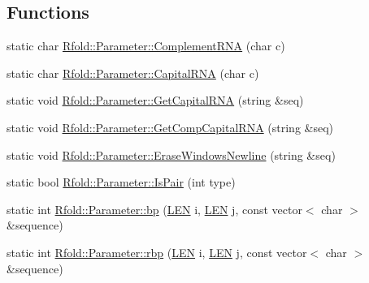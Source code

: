 \subsection*{Functions}
\begin{DoxyCompactItemize}
\item 
static char \hyperlink{namespace_rfold_1_1_parameter_a8042581cc300f83be2272d1ad1edd8d0}{Rfold\+::\+Parameter\+::\+Complement\+R\+N\+A} (char c)
\item 
static char \hyperlink{namespace_rfold_1_1_parameter_a9ecf67fadc41759309b73ccc9c3d7009}{Rfold\+::\+Parameter\+::\+Capital\+R\+N\+A} (char c)
\item 
static void \hyperlink{namespace_rfold_1_1_parameter_adc3e395c2db7c0097c3790922e221f18}{Rfold\+::\+Parameter\+::\+Get\+Capital\+R\+N\+A} (string \&seq)
\item 
static void \hyperlink{namespace_rfold_1_1_parameter_a064f7e3feb0336cd945b2679563f27a9}{Rfold\+::\+Parameter\+::\+Get\+Comp\+Capital\+R\+N\+A} (string \&seq)
\item 
static void \hyperlink{namespace_rfold_1_1_parameter_ae260f7c90b29ae24ffbc4589c9fc0c76}{Rfold\+::\+Parameter\+::\+Erase\+Windows\+Newline} (string \&seq)
\item 
static bool \hyperlink{namespace_rfold_1_1_parameter_ac79332af130ad1da3bb3bbd6008bca00}{Rfold\+::\+Parameter\+::\+Is\+Pair} (int type)
\item 
static int \hyperlink{namespace_rfold_1_1_parameter_a84c9aba4d96ad6776c066fdc8a05497f}{Rfold\+::\+Parameter\+::bp} (\hyperlink{energy__const_8hh_a05b49c662c073f89e86804f7856622a0}{L\+E\+N} i, \hyperlink{energy__const_8hh_a05b49c662c073f89e86804f7856622a0}{L\+E\+N} j, const vector$<$ char $>$ \&sequence)
\item 
static int \hyperlink{namespace_rfold_1_1_parameter_aec0b5515ac41c13814b1af83a843b408}{Rfold\+::\+Parameter\+::rbp} (\hyperlink{energy__const_8hh_a05b49c662c073f89e86804f7856622a0}{L\+E\+N} i, \hyperlink{energy__const_8hh_a05b49c662c073f89e86804f7856622a0}{L\+E\+N} j, const vector$<$ char $>$ \&sequence)
\end{DoxyCompactItemize}
